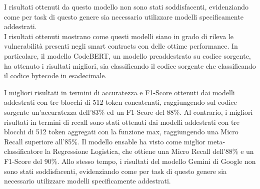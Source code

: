 \documentclass[../../Thesis.tex]{subfiles}
\begin{document}
I risultati ottenuti da questo modello non sono stati soddisfacenti, evidenziando come per task di questo genere sia necessario utilizzare modelli specificamente addestrati.\\


I risultati ottenuti mostrano come questi modelli siano in grado di rileva le vulnerabilità presenti negli smart contracts con delle ottime performance. In particolare, il modello CodeBERT, un modello preaddestrato su codice sorgente, ha ottenuto i risultati migliori, sia classificando il codice sorgente che classificando il codice bytecode in esadecimale. 

I migliori risultati in termini di accuratezza e F1-Score ottenuti dai modelli addestrati con tre blocchi di 512 token concatenati, raggiungendo sul codice sorgente un'accuratezza dell'83\% ed un F1-Score del 88\%. Al contrario, i migliori risultati in termini di recall sono stati ottenuti dai modelli addestrati con tre blocchi di 512 token aggregati con la funzione max, raggiungendo una Micro Recall superiore all'85\%. Il modello ensable ha visto come miglior meta-classificatore la Regressione Logistica, che ottiene una Micro Recall dell'88\% e un F1-Score del 90\%. Allo stesso tempo, i risultati del modello Gemini di Google non sono stati soddisfacenti, evidenziando come per task di questo genere sia necessario utilizzare modelli specificamente addestrati.
\end{document}
